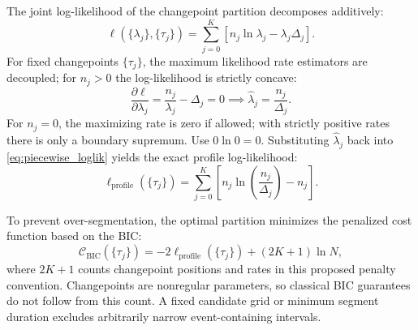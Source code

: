 \begin{theorem}
  \label{thm:piecewise_mle}
  The joint log-likelihood of the changepoint partition decomposes additively:
  \begin{equation}
    \ell(\{\lambda_j\}, \{\tau_j\}) = \sum_{j=0}^K \left[ n_j \ln
    \lambda_j - \lambda_j \Delta_j \right].
    \label{eq:piecewise_loglik}
  \end{equation}
  For fixed changepoints $\{\tau_j\}$, the maximum likelihood rate
  estimators are decoupled; for $n_j>0$ the log-likelihood is strictly concave:
  \begin{equation}
    \frac{\partial \ell}{\partial \lambda_j} = \frac{n_j}{\lambda_j}
    - \Delta_j = 0 \implies \hat{\lambda}_j = \frac{n_j}{\Delta_j}.
    \label{eq:mle_lambda_j}
  \end{equation}
  For $n_j=0$, the maximizing rate is zero if allowed; with strictly
  positive rates there is only a boundary supremum. Use $0\ln0=0$.
  Substituting $\hat{\lambda}_j$ back into
  \cref{eq:piecewise_loglik} yields the exact profile log-likelihood:
  \begin{equation}
    \ell_{\mathrm{profile}}(\{\tau_j\}) = \sum_{j=0}^K \left[ n_j
    \ln\left(\frac{n_j}{\Delta_j}\right) - n_j \right].
    \label{eq:profile_loglik}
  \end{equation}
\end{theorem}

To prevent over-segmentation, the optimal partition minimizes the
penalized cost function based on the \ac{BIC}:
\begin{equation}
  \mathcal{C}_{\mathrm{BIC}}(\{\tau_j\}) = -2
  \ell_{\mathrm{profile}}(\{\tau_j\}) + (2K + 1)\ln N,
  \label{eq:bic_segmentation}
\end{equation}
where $2K+1$ counts changepoint positions and rates in this proposed
penalty convention. Changepoints are nonregular parameters, so classical
BIC guarantees do not follow from this count. A fixed candidate grid
or minimum segment duration excludes arbitrarily narrow
event-containing intervals.

